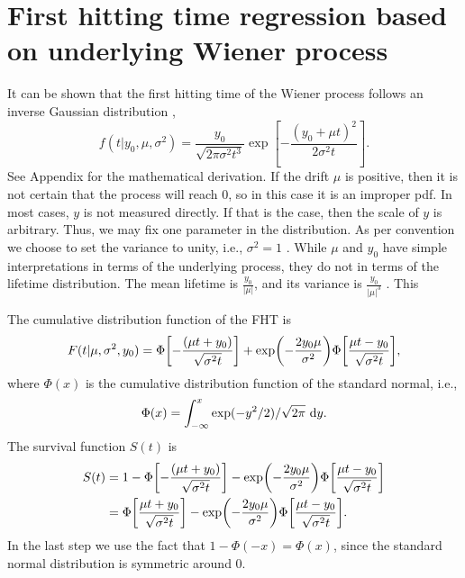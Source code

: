 \section{First hitting time regression based on underlying Wiener process}
It can be shown that the first hitting time of the Wiener process follows an inverse Gaussian distribution \citep{chhikara1988},
\begin{equation}
\label{eq:fht-ig}
    f(t|y_0,\mu,\sigma^2)=\frac{y_0}{\sqrt{2\pi\sigma^2t^3}}\exp\left[-\frac{(y_0+\mu t)^2}{2\sigma^2t}\right].
\end{equation}
See Appendix  for the mathematical derivation. If the drift $\mu$ is positive, then it is not certain that the process will reach 0, so in this case it is an improper pdf. In most cases, $y$ is not measured directly. If that is the case, then the scale of $y$ is arbitrary. Thus, we may fix one parameter in the distribution. As per convention we choose to set the variance to unity, i.e., $\sigma^2=1$ \citep{leewhitmore2006,caroni2017}. While $\mu$ and $y_0$ have simple interpretations in terms of the underlying process, they do not in terms of the lifetime distribution. The mean lifetime is $\frac{y_0}{|\mu|}$, and its variance is $\frac{y_0}{|\mu|^3}$ \citep{caroni2017}. This 

The cumulative distribution function of the FHT is \citep{threg}
\begin{equation}\label{eq:cumulative}
    F(t|\mu,\sigma^2,y_0)=\Phi\sqb*{-\frac{(\mu t+y_0)}{\sqrt{\sigma^2t}}}+\exp\p*{-\frac{2y_0\mu}{\sigma^2}}\Phi\sqb*{\frac{\mu t-y_0}{\sqrt{\sigma^2t}}},
\end{equation}
where $\Phi(x)$ is the cumulative distribution function of the standard normal, i.e.,
\begin{equation}
    \Phi(x)=\int_{-\infty}^x\exp(-y^2/2)/\sqrt{2\pi}\text{~d}y.
\end{equation}
The survival function $S(t)$ is
\begin{align}\label{eq:survival}
\begin{split}
S(t)&=1-\Phi\sqb*{-\frac{(\mu t+y_0)}{\sqrt{\sigma^2t}}}-\exp\p*{-\frac{2y_0\mu}{\sigma^2}}\Phi\sqb*{\frac{\mu t-y_0}{\sqrt{\sigma^2t}}}\\
&=\Phi\sqb*{\frac{\mu t+y_0}{\sqrt{\sigma^2t}}}-\exp\p*{-\frac{2y_0\mu}{\sigma^2}}\Phi\sqb*{\frac{\mu t-y_0}{\sqrt{\sigma^2t}}}.
\end{split}
\end{align}
In the last step we use the fact that $1-\Phi(-x)=\Phi(x)$, since the standard normal distribution is symmetric around 0.

